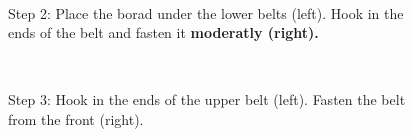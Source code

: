 \begin{figure}[!ht]
\centering
\mbox{\quad
{}}
\caption{Step 2: Place the borad under the lower belts (left). Hook in the ends of the belt and fasten it \bf{moderatly} (right).} %
\end{figure}

\begin{figure}[!ht]
\centering
\mbox{\quad
{}}
\caption{Step 3: Hook in the ends of the upper belt (left). Fasten the belt from the front (right).} %
\end{figure}

